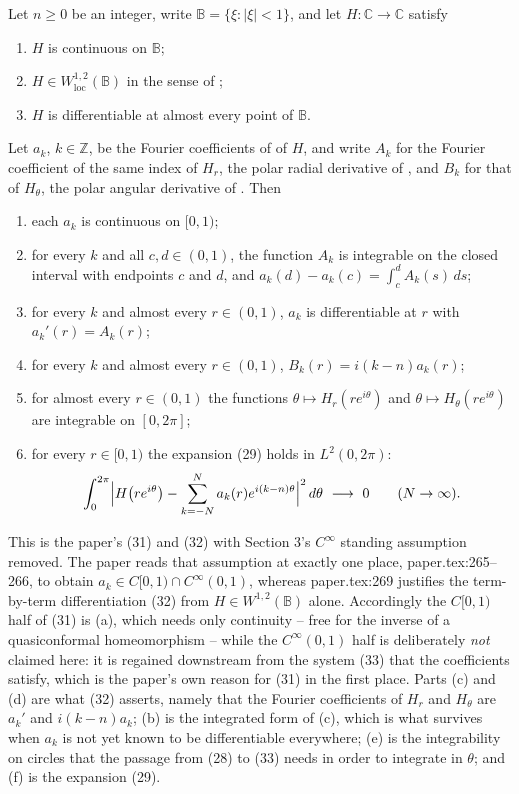 \begin{lemma}
Let $n\ge0$ be an integer, write $\mathbb{B}=\{\xi:|\xi|<1\}$, and let
$H\colon\mathbb{C}\to\mathbb{C}$ satisfy
\begin{enumerate}
\item[(H1)] $H$ is continuous on $\mathbb{B}$;
\item[(H2)] $H\in W^{1,2}_{\mathrm{loc}}(\mathbb{B})$ in the sense of
  ;
\item[(H3)] $H$ is differentiable at almost every point of $\mathbb{B}$.
\end{enumerate}
Let $a_k$, $k\in\mathbb{Z}$, be the Fourier coefficients of
 of $H$, and write $A_k$ for the Fourier coefficient of
the same index of $H_r$, the polar radial derivative of , and
$B_k$ for that of $H_\theta$, the polar angular derivative of
.  Then
\begin{enumerate}
\item[(a)] each $a_k$ is continuous on $[0,1)$;
\item[(b)] for every $k$ and all $c,d\in(0,1)$, the function $A_k$ is
  integrable on the closed interval with endpoints $c$ and $d$, and
  $a_k(d)-a_k(c)=\displaystyle\int_c^dA_k(s)\,ds$;
\item[(c)] for every $k$ and almost every $r\in(0,1)$, $a_k$ is differentiable
  at $r$ with $a_k'(r)=A_k(r)$;
\item[(d)] for every $k$ and almost every $r\in(0,1)$, $B_k(r)=i(k-n)a_k(r)$;
\item[(e)] for almost every $r\in(0,1)$ the functions
  $\theta\mapsto H_r(re^{i\theta})$ and $\theta\mapsto H_\theta(re^{i\theta})$
  are integrable on $[0,2\pi]$;
\item[(f)] for every $r\in[0,1)$ the expansion (29) holds in $L^2(0,2\pi)$:
\[
  \int_0^{2\pi}\Bigl|H\bigl(re^{i\theta}\bigr)
    -\sum_{k=-N}^{N}a_k(r)e^{i(k-n)\theta}\Bigr|^2\,d\theta\ \longrightarrow\ 0
  \qquad(N\to\infty).
\]
\end{enumerate}

This is the paper's (31) and (32) with Section 3's $C^\infty$ standing
assumption removed.  The paper reads that assumption at exactly one place,
paper.tex:265--266, to obtain $a_k\in C[0,1)\cap C^\infty(0,1)$, whereas
paper.tex:269 justifies the term-by-term differentiation (32) from
$H\in W^{1,2}(\mathbb{B})$ alone.  Accordingly the $C[0,1)$ half of (31) is (a),
which needs only continuity -- free for the inverse of a quasiconformal
homeomorphism -- while the $C^\infty(0,1)$ half is deliberately \emph{not}
claimed here: it is regained downstream from the system (33) that the
coefficients satisfy, which is the paper's own reason for (31) in the first
place.  Parts (c) and (d) are what (32) asserts, namely that the Fourier
coefficients of $H_r$ and $H_\theta$ are $a_k'$ and $i(k-n)a_k$; (b) is the
integrated form of (c), which is what survives when $a_k$ is not yet known to
be differentiable everywhere; (e) is the integrability on circles that the
passage from (28) to (33) needs in order to integrate in $\theta$; and (f) is
the expansion (29).
\end{lemma}
